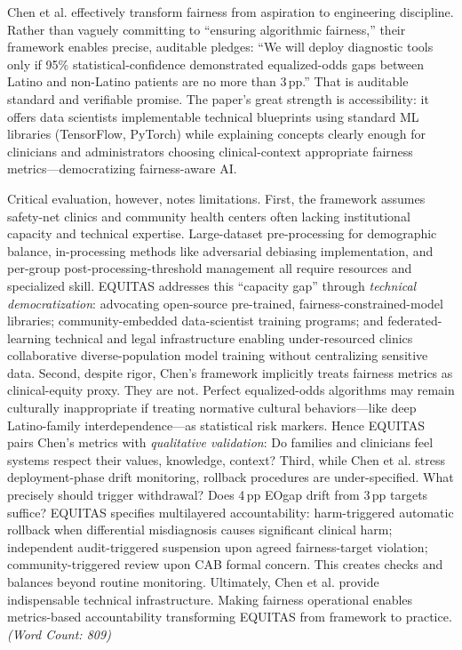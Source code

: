 \documentclass[11pt,twoside]{article}
\DeclareRobustCommand{\EOgap}{EO\text{-}gap\xspace}
\DeclareRobustCommand{\pp}{pp\xspace} %
\begin{document}
Chen et al. effectively transform fairness from aspiration to engineering discipline. Rather than vaguely committing to ``ensuring algorithmic fairness,'' their framework enables precise, auditable pledges: ``We will deploy diagnostic tools only if 95\% statistical-confidence demonstrated equalized-odds gaps between Latino and non-Latino patients are no more than 3\,\pp.'' That is auditable standard and verifiable promise. The paper's great strength is accessibility: it offers data scientists implementable technical blueprints using standard ML libraries (TensorFlow, PyTorch) while explaining concepts clearly enough for clinicians and administrators choosing clinical-context appropriate fairness metrics---democratizing fairness-aware AI.

Critical evaluation, however, notes limitations. First, the framework assumes safety-net clinics and community health centers often lacking institutional capacity and technical expertise. Large-dataset pre-processing for demographic balance, in-processing methods like adversarial debiasing implementation, and per-group post-processing-threshold management all require resources and specialized skill. \textsc{EQUITAS} addresses this ``capacity gap'' through \textit{technical democratization}: advocating open-source pre-trained, fairness-constrained-model libraries; community-embedded data-scientist training programs; and federated-learning technical and legal infrastructure enabling under-resourced clinics collaborative diverse-population model training without centralizing sensitive data. Second, despite rigor, Chen's framework implicitly treats fairness metrics as clinical-equity proxy. They are not. Perfect equalized-odds algorithms may remain culturally inappropriate if treating normative cultural behaviors---like deep Latino-family interdependence---as statistical risk markers. Hence \textsc{EQUITAS} pairs Chen's metrics with \textit{qualitative validation}: Do families and clinicians feel systems respect their values, knowledge, context? Third, while Chen et al. stress deployment-phase drift monitoring, rollback procedures are under-specified. What precisely should trigger withdrawal? Does 4\,\pp \EOgap drift from 3\,\pp targets suffice? \textsc{EQUITAS} specifies multilayered accountability: harm-triggered automatic rollback when differential misdiagnosis causes significant clinical harm; independent audit-triggered suspension upon agreed fairness-target violation; community-triggered review upon CAB formal concern. This creates checks and balances beyond routine monitoring. Ultimately, Chen et al. provide indispensable technical infrastructure. Making fairness operational enables metrics-based accountability transforming \textsc{EQUITAS} from framework to practice. \textit{(Word Count: 809)}
\end{document}
